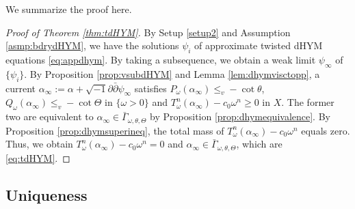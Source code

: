 \documentclass[10pt,a4paper]{amsart}
\numberwithin{equation}{section}
\newcommand{\delb}{\sqrt{-1}\partial\bar{\partial}}
\begin{document}
We summarize the proof here.

\begin{proof}[Proof of Theorem \ref{thm:tdHYM}]
    By Setup \ref{setup2} and Assumption \ref{asmp:bdrydHYM}, we have the solutions $\psi_i$ of approximate twisted dHYM equations \eqref{eq:appdhym}. By taking a subsequence, we obtain a weak limit $\psi_\infty$ of $\{\psi_i\}$. By Proposition \ref{prop:vsubdHYM} and Lemma \ref{lem:dhymvisctopp}, a current $\alpha_\infty:=\alpha+\delb\psi_\infty$ satisfies $P_\omega(\alpha_\infty)\le_v-\cot\theta$, $Q_\omega(\alpha_\infty)\le_v-\cot\Theta$ in $\{\omega>0\}$ and $T^n_{\omega}(\alpha_\infty)-c_0\omega^n\ge0$ in $X$. The former two are equivalent to $\alpha_\infty\in\bar{\Gamma}_{\omega,\theta,\Theta}$ by Proposition \ref{prop:dhymequivalence}.
    By Proposition \ref{prop:dhymsuperineq}, the total mass of $T^n_\omega(\alpha_\infty)-c_0\omega^n$ equals zero. Thus, we obtain $T^n_\omega(\alpha_\infty)-c_0\omega^n=0$ and $\alpha_\infty\in\bar
    \Gamma_{\omega,\theta,\Theta}$, which are \eqref{eq:tdHYM}.
\end{proof}


\subsection{Uniqueness}\label{subsec:dhymuniqueness}
\end{document}
